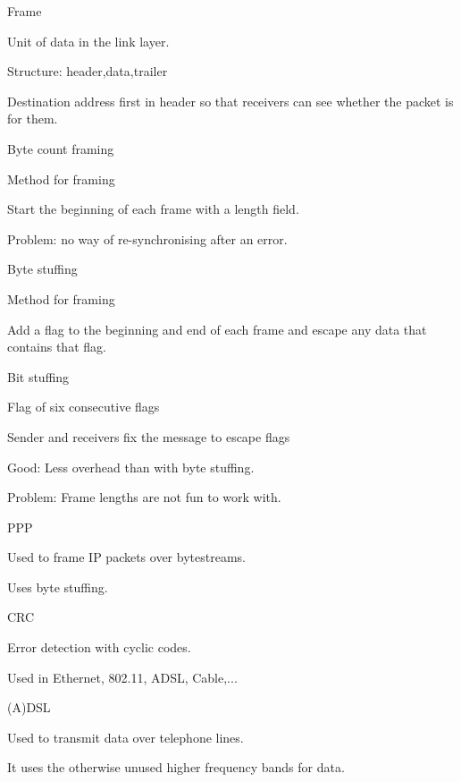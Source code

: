 \documentclass[main.tex]{subfiles}
\begin{document}
\small


\begin{card}{Frame}
\item Unit of data in the link layer.
\item Structure: header,data,trailer
\item Destination address first in header so that receivers can see whether the packet is for them.
\end{card}

\begin{card}{Byte count framing}
\item Method for framing
\item Start the beginning of each frame with a length field.
\item Problem: no way of re-synchronising after an error.
\end{card}

\begin{card}{Byte stuffing}
\item Method for framing
\item Add a flag to the beginning and end of each frame and escape any data that contains that flag.
\end{card}

\begin{card}{Bit stuffing}
\item Flag of six consecutive flags
\item Sender and receivers fix the message to escape flags
\item Good: Less overhead than with byte stuffing.
\item Problem: Frame lengths are not fun to work with.
\end{card}

\begin{card}{PPP}
\item Used to frame IP packets over bytestreams.
\item Uses byte stuffing.
\end{card}

\begin{card}{CRC}
\item Error detection with cyclic codes.
\item Used in Ethernet, 802.11, ADSL, Cable,...
\end{card}

\begin{card}{(A)DSL}
\item Used to transmit data over telephone lines.
\item It uses the otherwise unused higher frequency bands for data.
\end{card}
\end{document}
